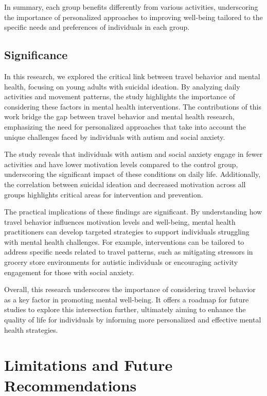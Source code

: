 \documentclass[
  letterpaper,
  number,
  review,
  3p]{elsarticle}
\begin{document}
In summary, each group benefits differently from various activities,
underscoring the importance of personalized approaches to improving
well-being tailored to the specific needs and preferences of individuals
in each group.

\subsection{Significance}\label{significance}

In this research, we explored the critical link between travel behavior
and mental health, focusing on young adults with suicidal ideation. By
analyzing daily activities and movement patterns, the study highlights
the importance of considering these factors in mental health
interventions. The contributions of this work bridge the gap between
travel behavior and mental health research, emphasizing the need for
personalized approaches that take into account the unique challenges
faced by individuals with autism and social anxiety.

The study reveals that individuals with autism and social anxiety engage
in fewer activities and have lower motivation levels compared to the
control group, underscoring the significant impact of these conditions
on daily life. Additionally, the correlation between suicidal ideation
and decreased motivation across all groups highlights critical areas for
intervention and prevention.

The practical implications of these findings are significant. By
understanding how travel behavior influences motivation levels and
well-being, mental health practitioners can develop targeted strategies
to support individuals struggling with mental health challenges. For
example, interventions can be tailored to address specific needs related
to travel patterns, such as mitigating stressors in grocery store
environments for autistic individuals or encouraging activity engagement
for those with social anxiety.

Overall, this research underscores the importance of considering travel
behavior as a key factor in promoting mental well-being. It offers a
roadmap for future studies to explore this intersection further,
ultimately aiming to enhance the quality of life for individuals by
informing more personalized and effective mental health strategies.


\section{Limitations and Future
Recommendations}\label{limitations-and-future-recommendations}
\end{document}
